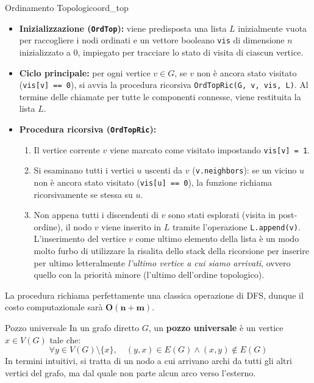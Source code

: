 \documentclass[12pt]{report}
\begin{document}
	\begin{algoritmo}{Ordinamento Topologico}{ord_top}
		\begin{itemize}
			\item \textbf{Inizializzazione (\texttt{OrdTop}):} viene predisposta una lista $L$ inizialmente vuota per raccogliere i nodi ordinati e un vettore booleano \texttt{vis} di dimensione $n$ inizializzato a $0$, impiegato per tracciare lo stato di visita di ciascun vertice.
			
			\item \textbf{Ciclo principale:} per ogni vertice $v \in G$, se $v$ non è ancora stato visitato (\texttt{vis[v] == 0}), si avvia la procedura ricorsiva \texttt{OrdTopRic(G, v, vis, L)}. Al termine delle chiamate per tutte le componenti connesse, viene restituita la lista $L$.
			
			\item \textbf{Procedura ricorsiva (\texttt{OrdTopRic}):}
			\begin{enumerate}
				\item Il vertice corrente $v$ viene marcato come visitato impostando \texttt{vis[v] = 1}.
				
				\item Si esaminano tutti i vertici $u$ uscenti da $v$ (\texttt{v.neighbors}): se un vicino $u$ non è ancora stato visitato (\texttt{vis[u] == 0}), la funzione richiama ricorsivamente se stessa su $u$.
				
				\item Non appena tutti i discendenti di $v$ sono stati esplorati (visita in post-ordine), il nodo $v$ viene inserito in $L$ tramite l'operazione \texttt{L.append(v)}. L'inserimento del vertice $v$ come ultimo elemento della lista è un modo molto furbo di utilizzare la risalita dello stack della ricorsione per inserire per ultimo letteralmente \textit{l'ultimo vertice a cui siamo arrivati}, ovvero quello con la priorità minore (l'ultimo dell'ordine topologico).
			\end{enumerate}
		\end{itemize}
	\end{algoritmo}
	
	La procedura richiama perfettamente una classica operazione di DFS, dunque il costo computazionale sarà $\mathbf{O(n + m)}$.
	
	\begin{definizione}{Pozzo universale}{}
		In un grafo diretto $G$, un \textbf{pozzo universale} è un vertice $x \in V(G)$ tale che:
		\[
		\forall y \in V(G) \setminus \{x\}, \quad (y, x) \in E(G) \land (x, y) \notin E(G)
		\]
		In termini intuitivi, si tratta di un nodo a cui arrivano archi da tutti gli altri vertici del grafo, ma dal quale non parte alcun arco verso l'esterno.
	\end{definizione}
	
\end{document}
